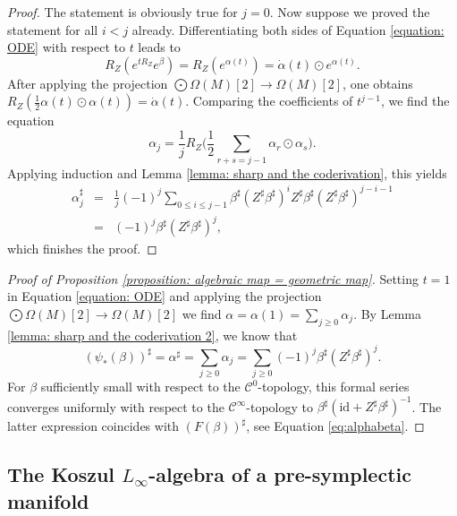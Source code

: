 \documentclass[11pt,thmsa]{amsart}
\theoremstyle{definition}
\begin{document}
{\begin{proof}
The statement is obviously true for $j=0$.
Now suppose we proved the statement for all $i<j$ already.
Differentiating both sides of Equation \eqref{equation: ODE} with respect to $t$ leads to
$$ R_Z(e^{tR_Z}e^{\beta}) = R_Z(e^{\alpha(t)})=\dot{\alpha}(t)\odot e^{\alpha(t)}.$$
 After applying the projection $\bigodot \Omega(M)[2]\to \Omega(M)[2]$,
one obtains $R_Z({\frac{1}{2}\alpha(t)}\odot {\alpha(t)})=\dot{\alpha}(t)$.  Comparing the coefficients of $t^{j-1}$,
we find the equation
$$ \alpha_{j} = \frac{1}{j}R_Z\Big(\frac{1}{2} \sum_{r+s=j-1} \alpha_r \odot \alpha_s\Big).$$
Applying induction and Lemma \ref{lemma: sharp and the coderivation},
this yields
\begin{eqnarray*}
\alpha_{j}^\sharp &=& \frac{1}{j}(-1)^j\sum_{0\le i\le j-1}\beta^\sharp(Z^\sharp\beta^\sharp)^{i}Z^\sharp\beta^\sharp(Z^\sharp\beta^\sharp)^{j-i-1} \\
&=& (-1)^j \beta^\sharp(Z^\sharp\beta^\sharp)^j,
\end{eqnarray*}
which finishes the proof.
\end{proof}



\begin{proof}[Proof of Proposition \ref{proposition: algebraic map = geometric map}]
Setting $t=1$ in Equation \eqref{equation: ODE} and applying the projection $\bigodot \Omega(M)[2]\to \Omega(M)[2]$ we find
 $\alpha=\alpha(1)=\sum_{j\ge 0} \alpha_j$.
By Lemma \ref{lemma: sharp and the coderivation 2}, we know that
$$(\psi_*(\beta))^\sharp =\alpha^\sharp= \sum_{j\ge 0}\alpha_j=\sum_{j\ge 0}(-1)^j\beta^\sharp(Z^\sharp\beta^\sharp)^j.$$
For $\beta$ sufficiently small with respect to the $\mathcal{C}^0$-topology,
this formal series converges uniformly with respect to the $\mathcal{C}^\infty$-topology to $\beta^\sharp(\mathrm{id}+Z^\sharp\beta^\sharp)^{-1}$.
 The latter expression coincides with $(F (\beta))^\sharp$, see Equation \eqref{eq:alphabeta}.



\end{proof}
 
 
 
 
 

\subsection{The Koszul $L_\infty$-algebra of a pre-symplectic manifold}
\label{subsection: Koszul for pre-symplectic}


}
\end{document}
